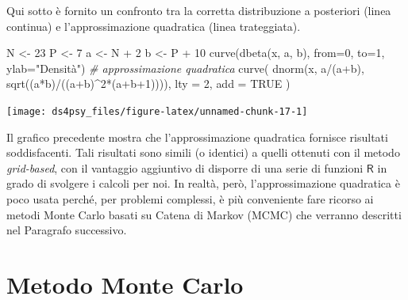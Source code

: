 \documentclass[
  11pt,
]{krantz}
\makeatletter
\newenvironment{Shaded}{\begin{snugshade}}{\end{snugshade}}
\newcommand{\AttributeTok}[1]{\textcolor[rgb]{0.61,0.61,0.61}{#1}}
\newcommand{\CommentTok}[1]{\textcolor[rgb]{0.37,0.37,0.37}{\textit{#1}}}
\newcommand{\ConstantTok}[1]{\textcolor[rgb]{0,0,0}{#1}}
\newcommand{\DecValTok}[1]{\textcolor[rgb]{0.06,0.06,0.06}{#1}}
\newcommand{\FunctionTok}[1]{\textcolor[rgb]{0,0,0}{#1}}
\newcommand{\NormalTok}[1]{#1}
\newcommand{\OtherTok}[1]{\textcolor[rgb]{0.37,0.37,0.37}{#1}}
\newcommand{\SpecialCharTok}[1]{\textcolor[rgb]{0,0,0}{#1}}
\newcommand{\StringTok}[1]{\textcolor[rgb]{0.5,0.5,0.5}{#1}}
\newenvironment{kframe}{%
\medskip{}
\setlength{\fboxsep}{.8em}
 \def\at@end@of@kframe{}%
 \ifinner\ifhmode%
  \def\at@end@of@kframe{\end{minipage}}%
  \begin{minipage}{\columnwidth}%
 \fi\fi%
 \def\FrameCommand##1{\hskip\@totalleftmargin \hskip-\fboxsep
 \colorbox{shadecolor}{##1}\hskip-\fboxsep
     \hskip-\linewidth \hskip-\@totalleftmargin \hskip\columnwidth}%
 \MakeFramed {\advance\hsize-\width
   \@totalleftmargin\z@ \linewidth\hsize
   \@setminipage}}%
 {\par\unskip\endMakeFramed%
 \at@end@of@kframe}
\renewenvironment{Shaded}{\begin{kframe}}{\end{kframe}}
\newcommand{\R}{\textsf{R}} %
\theoremstyle{definition}
\theoremstyle{definition}
\theoremstyle{definition}
\theoremstyle{definition}
\theoremstyle{remark}
\makeatother
\begin{document}
Qui sotto è fornito un confronto tra la corretta distribuzione a posteriori (linea continua) e l'approssimazione quadratica (linea trateggiata).

\begin{Shaded}
\begin{Highlighting}[]
\NormalTok{N }\OtherTok{\textless{}{-}} \DecValTok{23}
\NormalTok{P }\OtherTok{\textless{}{-}} \DecValTok{7}
\NormalTok{a }\OtherTok{\textless{}{-}}\NormalTok{ N }\SpecialCharTok{+} \DecValTok{2}
\NormalTok{b }\OtherTok{\textless{}{-}}\NormalTok{ P }\SpecialCharTok{+} \DecValTok{10}
\FunctionTok{curve}\NormalTok{(}\FunctionTok{dbeta}\NormalTok{(x, a, b), }\AttributeTok{from=}\DecValTok{0}\NormalTok{, }\AttributeTok{to=}\DecValTok{1}\NormalTok{, }\AttributeTok{ylab=}\StringTok{"Densità"}\NormalTok{)}
\CommentTok{\# approssimazione quadratica}
\FunctionTok{curve}\NormalTok{(}
  \FunctionTok{dnorm}\NormalTok{(x, a}\SpecialCharTok{/}\NormalTok{(a}\SpecialCharTok{+}\NormalTok{b), }\FunctionTok{sqrt}\NormalTok{((a}\SpecialCharTok{*}\NormalTok{b)}\SpecialCharTok{/}\NormalTok{((a}\SpecialCharTok{+}\NormalTok{b)}\SpecialCharTok{\^{}}\DecValTok{2}\SpecialCharTok{*}\NormalTok{(a}\SpecialCharTok{+}\NormalTok{b}\SpecialCharTok{+}\DecValTok{1}\NormalTok{)))),}
  \AttributeTok{lty =} \DecValTok{2}\NormalTok{,}
  \AttributeTok{add =} \ConstantTok{TRUE}
\NormalTok{)}
\end{Highlighting}
\end{Shaded}

\begin{center}\texttt{[image: ds4psy\_files/figure-latex/unnamed-chunk-17-1]} \end{center}

Il grafico precedente mostra che l'approssimazione quadratica fornisce risultati soddisfacenti. Tali risultati sono simili (o identici) a quelli ottenuti con il metodo \emph{grid-based}, con il vantaggio aggiuntivo di disporre di una serie di funzioni \(\R\) in grado di svolgere i calcoli per noi. In realtà, però, l'approssimazione quadratica è poco usata perché, per problemi complessi, è più conveniente fare ricorso ai metodi Monte Carlo basati su Catena di Markov (MCMC) che verranno descritti nel Paragrafo successivo.

\hypertarget{chapter-simulazioneMC}{%
\section{Metodo Monte Carlo}\label{chapter-simulazioneMC}}
\end{document}
